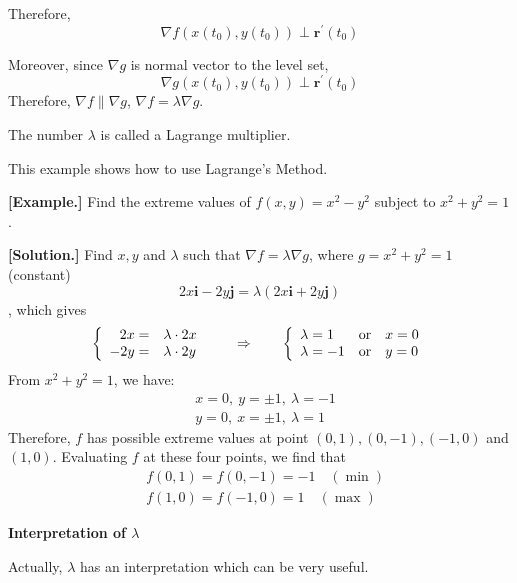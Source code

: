 \documentclass[11pt, a4paper]{MATH2023}
\newcommand{\eg}{\textbf{[Example.] }}
\newcommand{\sol}{\textbf{[Solution.] }}
\begin{document}
\begin{spacing}{1.3}
    Therefore, 
    $$\nabla f\left(x\left(t_{0}\right), y\left(t_{0}\right)\right)  \perp \mathbf{r}^{\prime}\left(t_{0}\right)$$
    
    Moreover, since $\nabla g$ is normal vector to the level set,
    $$\nabla g\left(x\left(t_{0}\right), y\left(t_{0}\right)\right)  \perp \mathbf{r}^{\prime}\left(t_{0}\right) $$
    Therefore, $\nabla f \parallel \nabla g$, $\nabla f=\lambda \nabla g$.
    
    The number $\lambda$ is called a Lagrange multiplier.

    \vspace{0.5in}
    {\blue This example shows how to use Lagrange's Method.}

    \eg Find the extreme values of $f(x, y)=x^{2}-y^{2}$ subject to $x^{2}+y^{2}=1$.
    
    \sol Find $x, y$ and $\lambda$ such that
    $\nabla f=\lambda \nabla g$, where $g=x^{2}+y^{2}=1$(constant) 
    $$2 x \mathbf{i}-2 y \mathbf{j}=\lambda(2 x \mathbf{i}+2 y \mathbf{j})$$
    , which gives
    $$
    \left\{\begin{array}{rl}
        2x= & \lambda \cdot 2x\\
        -2y= & \lambda \cdot 2y
    \end{array} \right.  \qquad \Rightarrow \qquad 
    \left\{\begin{array}{lcl}
        \lambda = 1 & {\rm or} & x=0\\
        \lambda = -1 & {\rm or} & y=0\\
    \end{array} \right.
    $$
    From $x^2+y^2=1$, we have:
    \begin{align*}
        &x=0,\ y=\pm 1,\ \lambda = -1\\
        &y=0,\ x=\pm 1,\ \lambda = 1
    \end{align*}
    Therefore, $f$ has possible extreme values at point $(0,1),(0,-1),(-1,0)$ and $(1,0)$. Evaluating $f$ at these four points, we find that
    $$\begin{aligned}
        &f(0,1)=f(0,-1)=-1 \quad(\min ) \\
        &f(1,0)=f(-1,0)=1 \quad(\max )
    \end{aligned}$$



    \newpage
    {\bf Interpretation of $\lambda$}

    {}

    Actually, $\lambda$ has an interpretation which can be very useful.


\end{spacing}
\end{document}
